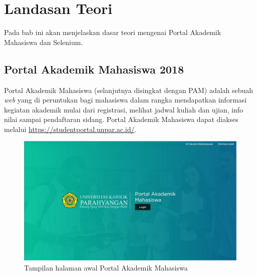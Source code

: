 \chapter{Landasan Teori}
\label{chap:teori}
Pada bab ini akan menjelaskan dasar teori mengenai Portal Akademik Mahasiswa dan Selenium. 

\section{Portal Akademik Mahasiswa 2018}
\label{sec:pam} 
Portal Akademik Mahasiswa (selanjutnya disingkat dengan PAM) adalah sebuah \textit{web} yang di peruntukan bagi mahasiswa dalam rangka mendapatkan informasi kegiatan akademik mulai dari registrasi, melihat jadwal kuliah dan ujian, info nilai sampai pendaftaran sidang\cite{portalunpar}. Portal Akademik Mahasiswa dapat diakses melalui \url{https://studentportal.unpar.ac.id/}. 

\begin{figure}[H]
	\centering
	\includegraphics[scale=0.4]{Gambar/halaman2018.jpg}
	\caption{Tampilan halaman awal Portal Akademik Mahasiswa} 
	\label{fig:studpor_home_2018}
\end{figure}

